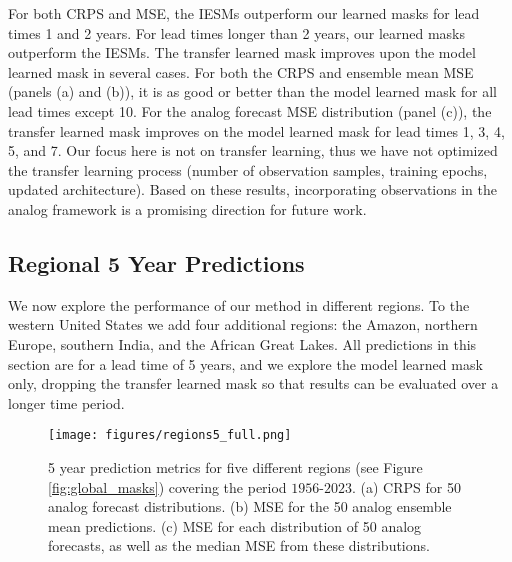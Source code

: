 For both CRPS and MSE, the IESMs outperform our learned masks for lead times 1 and 2 years.
For lead times longer than 2 years, our learned masks outperform the IESMs.
The transfer learned mask improves upon the model learned mask in several cases.
For both the CRPS and ensemble mean MSE (panels (a) and (b)), it is as good or better than the model learned mask for all lead times except 10.
For the analog forecast MSE distribution (panel (c)), the transfer learned mask improves on the model learned mask for lead times 1, 3, 4, 5, and 7.
Our focus here is not on transfer learning, thus we have not optimized the transfer learning process (number of observation samples, training epochs, updated architecture).
Based on these results, incorporating observations in the analog framework is a promising direction for future work.

\subsection{Regional 5 Year Predictions}\label{sec:regions}

We now explore the performance of our method in different regions.
To the western United States we add four additional regions: the Amazon, northern Europe, southern India, and the African Great Lakes.
All predictions in this section are for a lead time of 5 years, and we explore the model learned mask only, dropping the transfer learned mask so that results can be evaluated over a longer time period.

\begin{figure}[h!]
    \centering
    \noindent\texttt{[image: figures/regions5\_full.png]}
    \caption{5 year prediction metrics for five different regions (see Figure \ref{fig:global_masks}) covering the period $1956$-$2023$.
    (a) CRPS for 50 analog forecast distributions.
    (b) MSE for the 50 analog ensemble mean predictions.
    (c) MSE for each distribution of 50 analog forecasts, as well as the median MSE from these distributions.
    }
    \label{fig:metrics_regions_full}
\end{figure}

